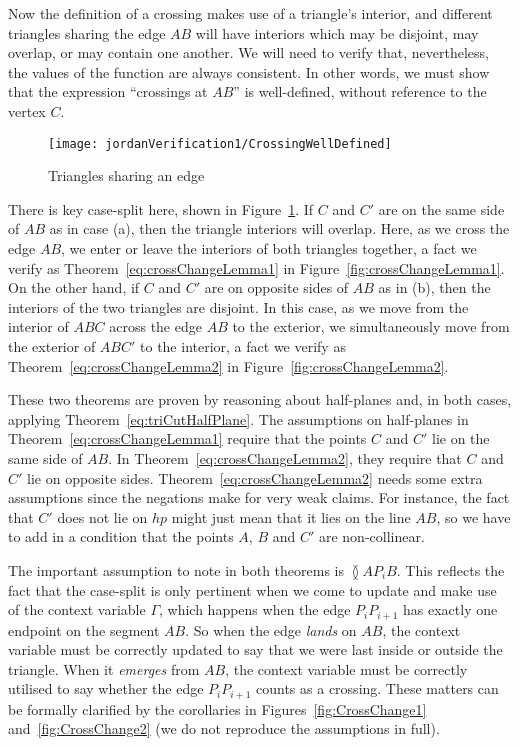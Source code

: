 Now the definition of a crossing makes use of a triangle's interior, and different triangles sharing the edge $AB$ will have interiors which may be disjoint, may overlap, or may contain one another. We will need to verify that, nevertheless, the values of the function  are always consistent. In other words, we must show that the expression ``crossings at $AB$'' is well-defined, without reference to the vertex $C$.

\begin{figure}
\centering\texttt{[image: jordanVerification1/CrossingWellDefined]}
\caption{Triangles sharing an edge}
\label{fig:CrossingWellDefined}
\end{figure}

There is key case-split here, shown in Figure~\ref{fig:CrossingWellDefined}. If $C$ and $C'$ are on the same side of $AB$ as in case (a), then the triangle interiors will overlap. Here, as we cross the edge $AB$, we enter or leave the interiors of both triangles together, a fact we verify as Theorem~\ref{eq:crossChangeLemma1} in Figure~\ref{fig:crossChangeLemma1}. On the other hand, if $C$ and $C'$ are on opposite sides of $AB$ as in (b), then the interiors of the two triangles are disjoint. In this case, as we move from the interior of $ABC$ across the edge $AB$ to the exterior, we simultaneously move from the exterior of $ABC'$ to the interior, a fact we verify as Theorem~\ref{eq:crossChangeLemma2} in Figure~\ref{fig:crossChangeLemma2}.

These two theorems are proven by reasoning about half-planes and, in both cases, applying Theorem~\ref{eq:triCutHalfPlane}. The assumptions on half-planes in Theorem~\ref{eq:crossChangeLemma1} require that the points $C$ and $C'$ lie on the same side of $AB$. In Theorem~\ref{eq:crossChangeLemma2}, they require that $C$ and $C'$ lie on opposite sides. Theorem~\ref{eq:crossChangeLemma2} needs some extra assumptions since the negations make for very weak claims. For instance, the fact that $C'$ does not lie on $hp$ might just mean that it lies on the line $AB$, so we have to add in a condition that the points $A$, $B$ and $C'$ are non-collinear.

The important assumption to note in both theorems is $\between{A}{P_i}{B}$. This reflects the fact that the case-split is only pertinent when we come to update and make use of the context variable $\Gamma$, which happens when the edge $P_iP_{i+1}$ has exactly one endpoint on the segment $AB$. So when the edge \emph{lands} on $AB$, the context variable must be correctly updated to say that we were last inside or outside the triangle. When it \emph{emerges} from $AB$, the context variable must be correctly utilised to say whether the edge $P_iP_{i+1}$ counts as a crossing. These matters can be formally clarified by the corollaries in Figures~\ref{fig:CrossChange1} and~\ref{fig:CrossChange2} (we do not reproduce the assumptions in full).

